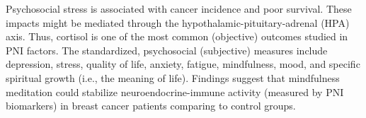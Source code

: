 \documentclass[jpm,article,submit,moreauthors,pdftex]{Definitions/mdpi}
\begin{document}
\begin{paracol}{2}
Psychosocial stress is associated with cancer incidence and poor survival\cite{Chida2008}.
These impacts might be mediated through the hypothalamic-pituitary-adrenal (HPA) axis\cite{Hsiao2012}.
Thus, cortisol is one of the most common (objective) outcomes studied in PNI factors. %
The standardized, psychosocial (subjective) measures include depression, stress, quality of life, anxiety, fatigue, mindfulness, mood, and specific spiritual growth (i.e., the meaning of life)\cite{Hsiao2012}. %
Findings suggest that mindfulness meditation could stabilize neuroendocrine-immune activity (measured by PNI biomarkers) in breast cancer patients comparing to control groups\cite{Hulett2016}.

\end{paracol}
\end{document}
